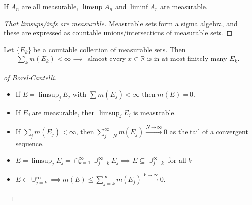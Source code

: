 \begin{proposition}

If \(A_{n}\) are all measurable, \(\limsup A_{n}\) and \(\liminf A_{n}\)
are measurable.

\end{proposition}

\begin{proof}[That limsups/infs are measurable]

Measurable sets form a sigma algebra, and these are expressed as
countable unions/intersections of measurable sets.

\end{proof}

\begin{theorem}

Let \(\{E_{k}\}\) be a countable collection of measurable sets. Then
\begin{align*}
\sum_{k} m(E_{k}) < \infty \implies \text{ almost every } x\in {\mathbb{R}}\text{ is in at most finitely many } E_{k}
.\end{align*}

\end{theorem}

\begin{proof}[of Borel-Cantelli]

\envlist

\begin{itemize}
\tightlist
\item
  If \(E = \limsup_{j} E_{j}\) with \(\sum m(E_{j}) < \infty\) then
  \(m(E) = 0\).
\item
  If \(E_{j}\) are measurable, then \(\limsup_{j} E_{j}\) is measurable.
\item
  If \(\sum_{j} m(E_{j}) < \infty\), then
  \(\sum_{j=N}^\infty m(E_{j}) \overset{N\to\infty}\to 0\) as the tail
  of a convergent sequence.
\item
  \(E = \limsup_{j} E_{j} = \cap_{k=1}^\infty \cup_{j=k}^\infty E_{j} \implies E \subseteq \cup_{j=k}^\infty\)
  for all \(k\)
\item
  \(E \subset \cup_{j=k}^\infty \implies m(E) \leq \sum_{j=k}^\infty m(E_{j}) \overset{k\to\infty}\to 0\).
\end{itemize}

\end{proof}

